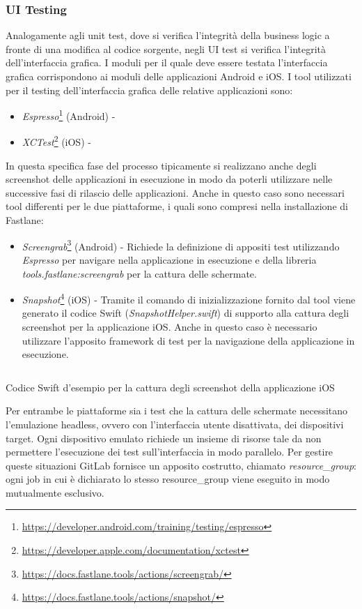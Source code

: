 \subsubsection{UI Testing}
Analogamente agli unit test, dove si verifica l'integrità della business logic a fronte di una modifica al codice sorgente, negli UI test si verifica l'integrità dell'interfaccia grafica. I moduli per il quale deve essere testata l'interfaccia grafica corrispondono ai moduli delle applicazioni Android e iOS. I tool utilizzati per il testing dell'interfaccia grafica delle relative applicazioni sono:
\begin{itemize}
    \item \textit{Espresso}\footnote{\url{https://developer.android.com/training/testing/espresso}} (Android) -
    \item \textit{XCTest}\footnote{\url{https://developer.apple.com/documentation/xctest}} (iOS) - 
\end{itemize}
In questa specifica fase del processo tipicamente si realizzano anche degli screenshot delle applicazioni in esecuzione in modo da poterli utilizzare nelle successive fasi di rilascio delle applicazioni. Anche in questo caso sono necessari tool differenti per le due piattaforme, i quali sono compresi nella installazione di Fastlane:
\begin{itemize}
    \item \textit{Screengrab}\footnote{\url{https://docs.fastlane.tools/actions/screengrab/}} (Android) - Richiede la definizione di appositi test utilizzando \textit{Espresso} per navigare nella applicazione in esecuzione e della libreria \textit{tools.fastlane:screengrab} per la cattura delle schermate.
    \item \textit{Snapshot}\footnote{\url{https://docs.fastlane.tools/actions/snapshot/}} (iOS) - Tramite il comando di inizializzazione fornito dal tool viene generato il codice Swift (\textit{SnapshotHelper.swift}) di supporto alla cattura degli screenshot per la applicazione iOS. Anche in questo caso è necessario utilizzare l'apposito framework di test per la navigazione della applicazione in esecuzione.
\end{itemize}

\begin{listing}[H]
\inputminted{swift}{code/4-ios-screenshot}
\caption{Codice Swift d'esempio per la cattura degli screenshot della applicazione iOS}
\end{listing}

Per entrambe le piattaforme sia i test che la cattura delle schermate necessitano l'emulazione headless, ovvero con l'interfaccia utente disattivata, dei dispositivi target. Ogni dispositivo emulato richiede un insieme di risorse tale da non permettere l'esecuzione dei test sull'interfaccia in modo parallelo. Per gestire queste situazioni GitLab fornisce un apposito costrutto, chiamato \textit{resource\_group}: ogni job in cui è dichiarato lo stesso resource\_group viene eseguito in modo mutualmente esclusivo.

